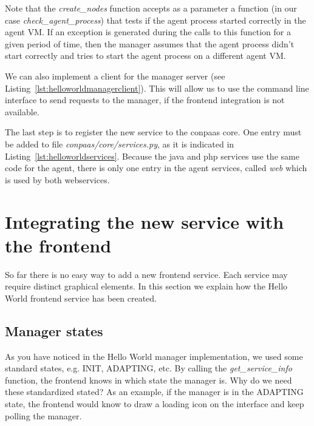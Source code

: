 \documentclass[10pt]{article}
\newcommand{\ConPaaSHOME}{..}
\begin{document}
Note that the \textit{create\_nodes} function accepts as a parameter a function (in our case \textit{check\_agent\_process}) that tests if the agent process started correctly in the agent VM. If an exception is generated during the calls to this function for a given period of time, then the manager assumes that the agent process didn't start correctly and tries to start the agent process on a different agent VM.   



We can also implement a client for the manager server (see Listing~\ref{lst:helloworldmanagerclient}). This will allow us to use the command line interface to send requests to the manager, if the frontend integration is not available.



The last step is to register the new service to the conpaas core. One entry must be added to file \textit{conpaas/core/services.py}, as it is indicated in Listing~\ref{lst:helloworldservices}. Because the java and php services use the same code for the agent, there is only one entry in the agent services, called \textit{web} which is used by both webservices.




\section{Integrating the new service with the frontend}

So far there is no easy way to add a new frontend service. Each service may require distinct graphical elements. In this section we explain how the Hello World frontend service has been created.

\subsection{Manager states}
As you have noticed in the Hello World manager implementation, we used some standard states, e.g. INIT, ADAPTING, etc. By calling the \textit{get\_service\_info} function, the frontend knows in which state the manager is. Why do we need these standardized stated? As an example, if the manager is in the ADAPTING state, the frontend would know to draw a loading icon on the interface and keep polling the manager. 
\end{document}
